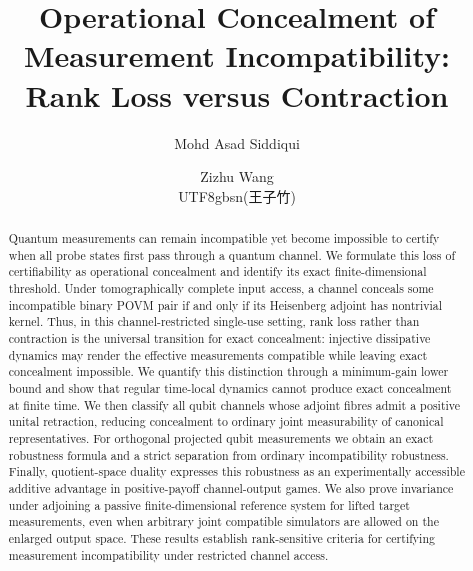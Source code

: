 \documentclass[
aps,pra,twocolumn,10pt,
superscriptaddress,longbibliography,floatfix
]{revtex4-2}
\begin{document}
\title{Operational Concealment of Measurement Incompatibility: Rank Loss versus Contraction}

\author{Mohd Asad Siddiqui\;}

\author{Zizhu Wang \begin{CJK}{UTF8}{gbsn}(王子竹)\end{CJK}\;}

\begin{abstract}
Quantum measurements can remain incompatible yet become impossible to certify when all probe states first pass through a quantum channel. We formulate this loss of certifiability as operational concealment and identify its exact finite-dimensional threshold. Under tomographically complete input access, a channel conceals some incompatible binary POVM pair if and only if its Heisenberg adjoint has nontrivial kernel. Thus, in this channel-restricted single-use setting, rank loss rather than contraction is the universal transition for exact concealment: injective dissipative dynamics may render the effective measurements compatible while leaving exact concealment impossible.
We quantify this distinction through a minimum-gain lower bound and show that regular time-local dynamics cannot produce exact concealment at finite time. We then classify all qubit channels whose adjoint fibres admit a positive unital retraction, reducing concealment to ordinary joint measurability of canonical representatives. For orthogonal projected qubit measurements we obtain an exact robustness formula and a strict separation from ordinary incompatibility robustness. Finally, quotient-space duality expresses this robustness as an experimentally accessible additive advantage in positive-payoff channel-output games. We also prove invariance under adjoining a passive finite-dimensional reference system for lifted target measurements, even when arbitrary joint compatible simulators are allowed on the enlarged output space. These results establish rank-sensitive criteria for certifying measurement incompatibility under restricted channel access.
\end{abstract}
\end{document}
